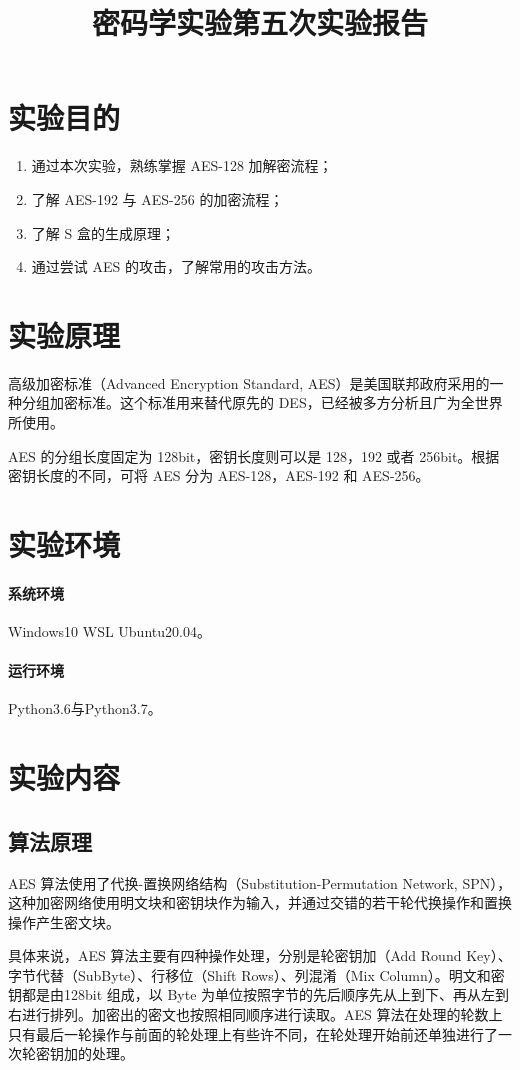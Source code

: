 \documentclass[a4paper, zihao=-4, UTF-8]{ctexart}
\title{\textbf{密码学实验第五次实验报告} }
\date{}
\begin{document}
	\maketitle
	\tableofcontents
	\newpage
	\section{实验目的}
	\begin{enumerate}[1.]
		\item 通过本次实验，熟练掌握 AES-128 加解密流程；
		\item 了解 AES-192 与 AES-256 的加密流程；
		\item 了解 S 盒的生成原理；
		\item 通过尝试 AES 的攻击，了解常用的攻击方法。
	\end{enumerate}
	\section{实验原理}
	高级加密标准（Advanced Encryption Standard, AES）是美国联邦政府采用的一种分组加密标准。这个标准用来替代原先的 DES，已经被多方分析且广为全世界所使用。
	
	AES 的分组长度固定为 128bit，密钥长度则可以是 128，192 或者 256bit。根据密钥长度的不同，可将 AES 分为 AES-128，AES-192 和 AES-256。
	\section{实验环境}
		\paragraph*{系统环境} Windows10 WSL Ubuntu20.04。
		\paragraph*{运行环境} Python3.6与Python3.7。
	\section{实验内容}
	\subsection{算法原理}
	AES 算法使用了代换-置换网络结构（Substitution-Permutation Network, SPN），这种加密网络使用明文块和密钥块作为输入，并通过交错的若干轮代换操作和置换操作产生密文块。
	
	具体来说，AES 算法主要有四种操作处理，分别是轮密钥加（Add Round Key）、字节代替（SubByte）、行移位（Shift Rows）、列混淆（Mix Column）。明文和密钥都是由128bit 组成，以 Byte 为单位按照字节的先后顺序先从上到下、再从左到右进行排列。加密出的密文也按照相同顺序进行读取。AES 算法在处理的轮数上只有最后一轮操作与前面的轮处理上有些许不同，在轮处理开始前还单独进行了一次轮密钥加的处理。
	
\end{document}
